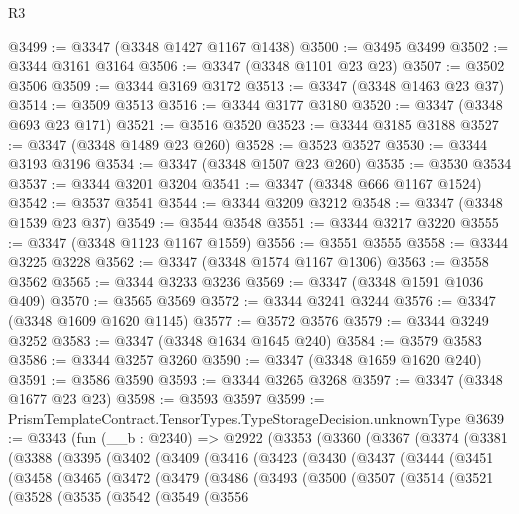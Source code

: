 \begin{lexlean}{R3}
\begin{coremodule}
@3499 := @3347 (@3348 @1427 @1167 @1438)
@3500 := @3495 @3499
@3502 := @3344 @3161 @3164
@3506 := @3347 (@3348 @1101 @23 @23)
@3507 := @3502 @3506
@3509 := @3344 @3169 @3172
@3513 := @3347 (@3348 @1463 @23 @37)
@3514 := @3509 @3513
@3516 := @3344 @3177 @3180
@3520 := @3347 (@3348 @693 @23 @171)
@3521 := @3516 @3520
@3523 := @3344 @3185 @3188
@3527 := @3347 (@3348 @1489 @23 @260)
@3528 := @3523 @3527
@3530 := @3344 @3193 @3196
@3534 := @3347 (@3348 @1507 @23 @260)
@3535 := @3530 @3534
@3537 := @3344 @3201 @3204
@3541 := @3347 (@3348 @666 @1167 @1524)
@3542 := @3537 @3541
@3544 := @3344 @3209 @3212
@3548 := @3347 (@3348 @1539 @23 @37)
@3549 := @3544 @3548
@3551 := @3344 @3217 @3220
@3555 := @3347 (@3348 @1123 @1167 @1559)
@3556 := @3551 @3555
@3558 := @3344 @3225 @3228
@3562 := @3347 (@3348 @1574 @1167 @1306)
@3563 := @3558 @3562
@3565 := @3344 @3233 @3236
@3569 := @3347 (@3348 @1591 @1036 @409)
@3570 := @3565 @3569
@3572 := @3344 @3241 @3244
@3576 := @3347 (@3348 @1609 @1620 @1145)
@3577 := @3572 @3576
@3579 := @3344 @3249 @3252
@3583 := @3347 (@3348 @1634 @1645 @240)
@3584 := @3579 @3583
@3586 := @3344 @3257 @3260
@3590 := @3347 (@3348 @1659 @1620 @240)
@3591 := @3586 @3590
@3593 := @3344 @3265 @3268
@3597 := @3347 (@3348 @1677 @23 @23)
@3598 := @3593 @3597
@3599 := PrismTemplateContract.TensorTypes.TypeStorageDecision.unknownType
@3639 := @3343
    (fun (__b : @2340) =>
    @2922
      (@3353
        (@3360
          (@3367
            (@3374
              (@3381
                (@3388
                  (@3395
                    (@3402
                      (@3409
                        (@3416
                          (@3423
                            (@3430
                              (@3437
                                (@3444
                                  (@3451
                                    (@3458
                                      (@3465
                                        (@3472
                                          (@3479
                                            (@3486
                                              (@3493
                                                (@3500
                                                  (@3507
                                                    (@3514
                                                      (@3521
                                                        (@3528
                                                          (@3535
                                                            (@3542
                                                              (@3549
                                                                (@3556

\end{coremodule}
\end{lexlean}
